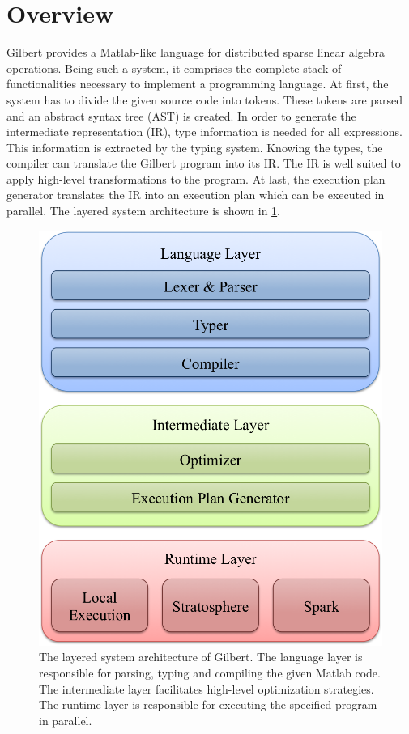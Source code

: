 \section{Overview}
\label{cha:overview}

Gilbert provides a Matlab-like language for distributed sparse linear algebra operations.
Being such a system, it comprises the complete stack of functionalities necessary to implement a programming language.
At first, the system has to divide the given source code into tokens.
These tokens are parsed and an abstract syntax tree (AST) is created.
In order to generate the intermediate representation (IR), type information is needed for all expressions.
This information is extracted by the typing system.
Knowing the types, the compiler can translate the Gilbert program into its IR.
The IR is well suited to apply high-level transformations to the program.
At last, the execution plan generator translates the IR into an execution plan which can be executed in parallel.
The layered system architecture is shown in \cref{fig:systemArchitecture}.

\begin{figure}
	\centering
	\includegraphics[height=0.175\paperheight]{images/systemArchitecture.png}
	\caption{The layered system architecture of Gilbert. The language layer is responsible for parsing, typing and compiling the given Matlab code. The intermediate layer facilitates high-level optimization strategies. The runtime layer is responsible for executing the specified program in parallel.}
	\label{fig:systemArchitecture}
\end{figure}

